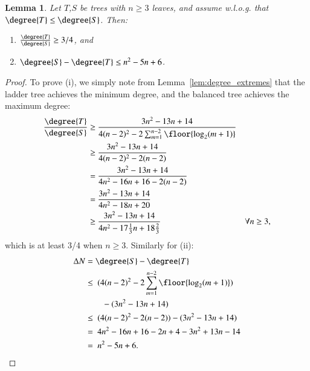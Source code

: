 \documentclass[]{elsarticle}
\newtheorem{lem}[thm]{Lemma}
\begin{document}
\begin{lem}
	\label{lem:degree_max_delta}
	Let $T$,$S$ be trees with $n \ge 3$ leaves, and assume w.l.o.g. that $\degree{T} \le \degree{S}$.
	Then:
	\begin{enumerate}
		\item $\frac{\degree{T}}{\degree{S}} \ge 3/4$, and
		\item $\degree{S} - \degree{T} \le n^2 - 5n + 6$.
	\end{enumerate}
\end{lem}
\begin{proof}
	To prove (i), we simply note from Lemma~\ref{lem:degree_extremes} that the ladder tree achieves the minimum degree, and the balanced tree achieves the maximum degree:
	\begin{align*}
		\frac{\degree{T}}{\degree{S}} \ge\ &\frac{3n^2 - 13n + 14}{4(n-2)^2 - 2 \sum_{m=1}^{n-2} \floor{\log_2(m+1)}} \\
		\ge\ &\frac{3n^2 - 13n + 14}{4(n-2)^2 - 2(n-2)} \\
		= \ &\frac{3n^2 - 13n + 14}{4n^2 - 16n + 16 - 2(n-2)} \\
		= \ &\frac{3n^2 - 13n + 14}{4n^2 - 18n + 20} \\
		\ge\ &\frac{3n^2 - 13n + 14}{4n^2 - 17\frac{1}{3}n + 18\frac{2}{3}} &\forall n \ge 3, \\
	\end{align*}
	which is at least 3/4 when $n \ge 3$.
    Similarly for (ii):
	\begin{align*}
		{\Delta}N &= \degree{S} - \degree{T} \\
		&\le\ (4(n-2)^2 - 2 \sum_{m=1}^{n-2} \floor{\log_2(m+1)}) \\
		&\ \ \ \ \ \ \ \ - (3n^2 - 13n + 14) \\
		&\le\ (4(n-2)^2 - 2(n-2)) - (3n^2 - 13n + 14) \\
		&=\ 4n^2 - 16n + 16 - 2n +4 - 3n^2 + 13n - 14 \\
		&=\ n^2 - 5n + 6.
	\end{align*}
\end{proof}
\end{document}
